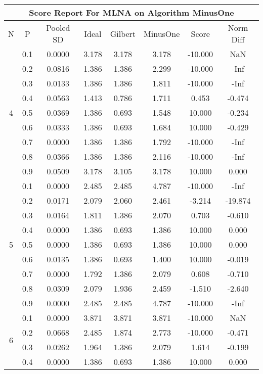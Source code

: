\documentclass[11pt,a4paper]{report}
\begin{document}
\begin{longtable}{ | c | c || c | c | c | c | c | c | }
\hline
\multicolumn{8}{|c|}{ Score Report For MLNA on Algorithm MinusOne} \\
\hline
N & P & Pooled SD &  Ideal &  Gilbert & MinusOne  & Score & Norm Diff \\
 \hline
 \hline
 \endhead
\multirow{9}{*}{4} & 0.1 & 0.0000 & 3.178 & 3.178 & 3.178 & -10.000 & NaN \\
 & 0.2 & 0.0816 & 1.386 & 1.386 & 2.299 & -10.000 & -Inf \\
 & 0.3 & 0.0133 & 1.386 & 1.386 & 1.811 & -10.000 & -Inf \\
 & 0.4 & 0.0563 & 1.413 & 0.786 & 1.711 & 0.453 & -0.474 \\
 & 0.5 & 0.0369 & 1.386 & 0.693 & 1.548 & 10.000 & -0.234 \\
 & 0.6 & 0.0333 & 1.386 & 0.693 & 1.684 & 10.000 & -0.429 \\
 & 0.7 & 0.0000 & 1.386 & 1.386 & 1.792 & -10.000 & -Inf \\
 & 0.8 & 0.0366 & 1.386 & 1.386 & 2.116 & -10.000 & -Inf \\
 & 0.9 & 0.0509 & 3.178 & 3.105 & 3.178 & 10.000 & 0.000 \\
 \hline
\multirow{9}{*}{5} & 0.1 & 0.0000 & 2.485 & 2.485 & 4.787 & -10.000 & -Inf \\
 & 0.2 & 0.0171 & 2.079 & 2.060 & 2.461 & -3.214 & -19.874 \\
 & 0.3 & 0.0164 & 1.811 & 1.386 & 2.070 & 0.703 & -0.610 \\
 & 0.4 & 0.0000 & 1.386 & 0.693 & 1.386 & 10.000 & 0.000 \\
 & 0.5 & 0.0000 & 1.386 & 0.693 & 1.386 & 10.000 & 0.000 \\
 & 0.6 & 0.0135 & 1.386 & 0.693 & 1.400 & 10.000 & -0.019 \\
 & 0.7 & 0.0000 & 1.792 & 1.386 & 2.079 & 0.608 & -0.710 \\
 & 0.8 & 0.0309 & 2.079 & 1.936 & 2.459 & -1.510 & -2.640 \\
 & 0.9 & 0.0000 & 2.485 & 2.485 & 4.787 & -10.000 & -Inf \\
 \hline
\multirow{9}{*}{6} & 0.1 & 0.0000 & 3.871 & 3.871 & 3.871 & -10.000 & NaN \\
 & 0.2 & 0.0668 & 2.485 & 1.874 & 2.773 & -10.000 & -0.471 \\
 & 0.3 & 0.0262 & 1.964 & 1.386 & 2.079 & 1.614 & -0.199 \\
 & 0.4 & 0.0000 & 1.386 & 0.693 & 1.386 & 10.000 & 0.000 \\

\end{longtable}
\end{document}
